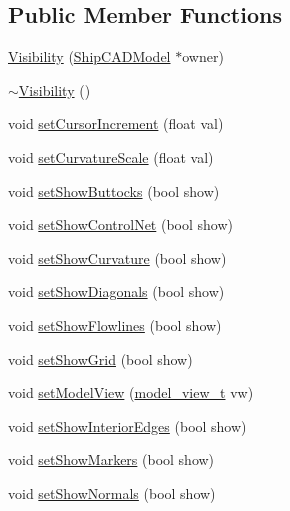 \subsection*{Public Member Functions}
\begin{DoxyCompactItemize}
\item 
\hyperlink{classShipCAD_1_1Visibility_a7b3d38d4dd65392de8b2bac001afe6e8}{Visibility} (\hyperlink{classShipCAD_1_1ShipCADModel}{Ship\-C\-A\-D\-Model} $\ast$owner)
\item 
\hyperlink{classShipCAD_1_1Visibility_a653098c74de41abb0a46c455b24c9d3a}{$\sim$\-Visibility} ()
\item 
void \hyperlink{classShipCAD_1_1Visibility_a665efac6ef5dfdd3baab521fcbd96cb6}{set\-Cursor\-Increment} (float val)
\item 
void \hyperlink{classShipCAD_1_1Visibility_a5487027d259912f366351938a1a87085}{set\-Curvature\-Scale} (float val)
\item 
void \hyperlink{classShipCAD_1_1Visibility_a2ea3576dccadf48e83dd39ff1baef582}{set\-Show\-Buttocks} (bool show)
\item 
void \hyperlink{classShipCAD_1_1Visibility_a1328ed03510bc763298e607c6114345a}{set\-Show\-Control\-Net} (bool show)
\item 
void \hyperlink{classShipCAD_1_1Visibility_acfa3dd5d3888a202a9a400bc14ca661f}{set\-Show\-Curvature} (bool show)
\item 
void \hyperlink{classShipCAD_1_1Visibility_a5219985a9dde8fe4b78a76587b592495}{set\-Show\-Diagonals} (bool show)
\item 
void \hyperlink{classShipCAD_1_1Visibility_af62123197cccb5568a26da2b213c98a5}{set\-Show\-Flowlines} (bool show)
\item 
void \hyperlink{classShipCAD_1_1Visibility_addb6766903b4794f30ff10617c99cc6f}{set\-Show\-Grid} (bool show)
\item 
void \hyperlink{classShipCAD_1_1Visibility_a394466c98ad68161f7ab904db897e85f}{set\-Model\-View} (\hyperlink{namespaceShipCAD_a742f9cd95e62e207769e17467ecd5bb7}{model\-\_\-view\-\_\-t} vw)
\item 
void \hyperlink{classShipCAD_1_1Visibility_a1812f546ea73152745826ee4a76d7062}{set\-Show\-Interior\-Edges} (bool show)
\item 
void \hyperlink{classShipCAD_1_1Visibility_aa81c24a60b066729bbf76872649f570f}{set\-Show\-Markers} (bool show)
\item 
void \hyperlink{classShipCAD_1_1Visibility_abbbc7bb99302c255b2fadf985e0825ee}{set\-Show\-Normals} (bool show)

\end{DoxyCompactItemize}
